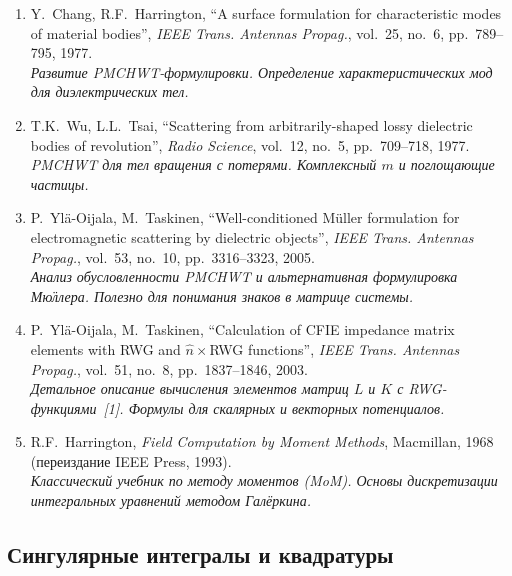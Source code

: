 \documentclass[12pt,a4paper]{article}
\begin{document}
\begin{enumerate}[resume]
  \item Y.~Chang, R.F.~Harrington, ``A surface formulation for characteristic modes of material bodies'', \textit{IEEE Trans. Antennas Propag.}, vol.~25, no.~6, pp.~789--795, 1977.
  \\ \textit{Развитие PMCHWT-формулировки. Определение характеристических мод для диэлектрических тел.}

  \item T.K.~Wu, L.L.~Tsai, ``Scattering from arbitrarily-shaped lossy dielectric bodies of revolution'', \textit{Radio Science}, vol.~12, no.~5, pp.~709--718, 1977.
  \\ \textit{PMCHWT для тел вращения с потерями. Комплексный $m$ и поглощающие частицы.}

  \item P.~Yl{\"a}-Oijala, M.~Taskinen, ``Well-conditioned M{\"u}ller formulation for electromagnetic scattering by dielectric objects'', \textit{IEEE Trans. Antennas Propag.}, vol.~53, no.~10, pp.~3316--3323, 2005.
  \\ \textit{Анализ обусловленности PMCHWT и альтернативная формулировка М{\"ю}ллера. Полезно для понимания знаков в матрице системы.}

  \item P.~Yl{\"a}-Oijala, M.~Taskinen, ``Calculation of CFIE impedance matrix elements with RWG and $\hat{n}\times$RWG functions'', \textit{IEEE Trans. Antennas Propag.}, vol.~51, no.~8, pp.~1837--1846, 2003.
  \\ \textit{Детальное описание вычисления элементов матриц $L$ и $K$ с RWG-функциями~[1]. Формулы для скалярных и векторных потенциалов.}

  \item R.F.~Harrington, \textit{Field Computation by Moment Methods}, Macmillan, 1968 (переиздание IEEE Press, 1993).
  \\ \textit{Классический учебник по методу моментов (MoM). Основы дискретизации интегральных уравнений методом Галёркина.}
\end{enumerate}

\subsection{Сингулярные интегралы и квадратуры}
\end{document}
